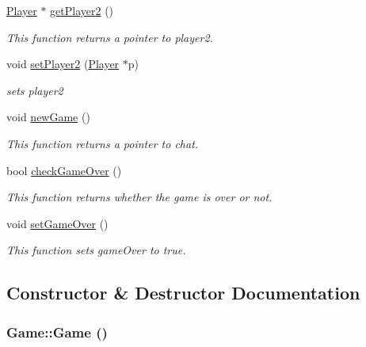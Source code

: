 \begin{DoxyCompactItemize}
\hyperlink{classPlayer}{Player} $\ast$ \hyperlink{classGame_af0be7c35ebd72bbbf428331bd81aeacd}{getPlayer2} ()
\begin{DoxyCompactList}\small\item\em This function returns a pointer to player2. \item\end{DoxyCompactList}\item 
void \hyperlink{classGame_a4e8f17a058c9444a6257dc2e975b099f}{setPlayer2} (\hyperlink{classPlayer}{Player} $\ast$p)
\begin{DoxyCompactList}\small\item\em sets player2 \item\end{DoxyCompactList}\item 
void \hyperlink{classGame_a12f32ba70a35a0dcd1f527b4d4a0d2c4}{newGame} ()
\begin{DoxyCompactList}\small\item\em This function returns a pointer to chat. \item\end{DoxyCompactList}\item 
bool \hyperlink{classGame_ae8cc2b6b0b07924769189f2fa7e07e2d}{checkGameOver} ()
\begin{DoxyCompactList}\small\item\em This function returns whether the game is over or not. \item\end{DoxyCompactList}\item 
\hypertarget{classGame_a929c4b051000c20994aa75508f06e688}{
void \hyperlink{classGame_a929c4b051000c20994aa75508f06e688}{setGameOver} ()}
\label{classGame_a929c4b051000c20994aa75508f06e688}

\begin{DoxyCompactList}\small\item\em This function sets gameOver to true. \item\end{DoxyCompactList}\end{DoxyCompactItemize}


\subsection{Constructor \& Destructor Documentation}
\hypertarget{classGame_ad59df6562a58a614fda24622d3715b65}{
\subsubsection[{Game}]{\setlength{\rightskip}{0pt plus 5cm}Game::Game ()}}
\label{classGame_ad59df6562a58a614fda24622d3715b65}


